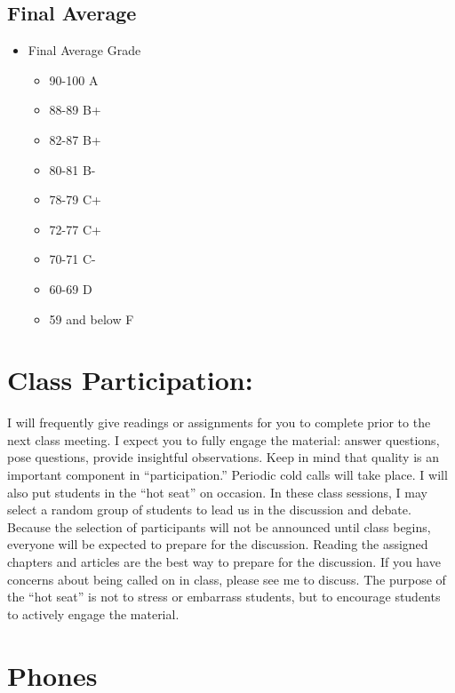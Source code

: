 \documentclass[
]{book}
\providecommand{\tightlist}{%
  \setlength{\itemsep}{0pt}\setlength{\parskip}{0pt}}
\begin{document}
\hypertarget{final-average}{%
\subsection{Final Average}\label{final-average}}

\begin{itemize}
\tightlist
\item
  Final Average Grade

  \begin{itemize}
  \tightlist
  \item
    90-100 A
  \item
    88-89 B+
  \item
    82-87 B+
  \item
    80-81 B-
  \item
    78-79 C+
  \item
    72-77 C+
  \item
    70-71 C-
  \item
    60-69 D
  \item
    59 and below F
  \end{itemize}
\end{itemize}

\hypertarget{class-participation}{%
\section{Class Participation:}\label{class-participation}}

I will frequently give readings or assignments for you to complete prior to the next class meeting. I expect you to fully engage the material: answer questions, pose questions, provide insightful observations. Keep in mind that quality is an important component in ``participation.'' Periodic cold calls will take place. I will also put students in the ``hot seat'' on occasion. In these class sessions, I may select a random group of students to lead us in the discussion and debate. Because the selection of participants will not be announced until class begins, everyone will be expected to prepare for the discussion. Reading the assigned chapters and articles are the best way to prepare for the discussion. If you have concerns about being called on in class, please see me to discuss. The purpose of the ``hot seat'' is not to stress or embarrass students, but to encourage students to actively engage the material.

\hypertarget{phones}{%
\section{Phones}\label{phones}}
\end{document}
